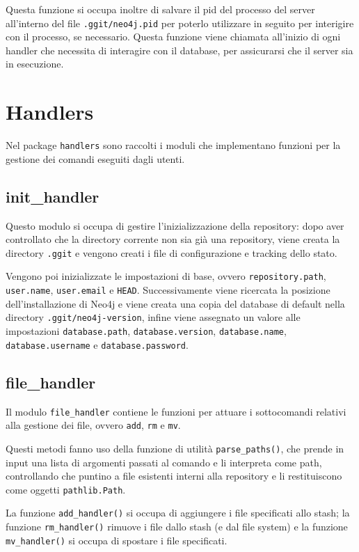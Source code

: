 Questa funzione si occupa inoltre di salvare il pid del processo del server all'interno del file \texttt{.ggit/neo4j.pid} per poterlo utilizzare in seguito per interigire con il processo, se necessario.
Questa funzione viene chiamata all'inizio di ogni handler che necessita di interagire con il database, per assicurarsi che il server sia in esecuzione.

\section{Handlers}
Nel package \texttt{handlers} sono raccolti i moduli che implementano funzioni per la gestione dei comandi eseguiti dagli utenti.



\subsection{init\_handler}
Questo modulo si occupa di gestire l'inizializzazione della repository: dopo aver controllato che la directory corrente non sia già una repository, viene creata la directory \texttt{.ggit} e vengono creati i file di configurazione e tracking dello stato.

Vengono poi inizializzate le impostazioni di base, ovvero \texttt{repository.path}, \texttt{user.name}, \texttt{user.email} e \texttt{HEAD}. 
Successivamente viene ricercata la posizione dell'installazione di Neo4j e viene creata una copia del database di default nella directory \texttt{.ggit/neo4j-version}, infine viene assegnato un valore alle impostazioni \texttt{database.path}, \texttt{database.version}, \texttt{database.name}, \texttt{database.username} e \texttt{database.password}.

\subsection{file\_handler}
Il modulo \texttt{file\_handler} contiene le funzioni per attuare i sottocomandi relativi alla gestione dei file, ovvero \texttt{add}, \texttt{rm} e \texttt{mv}.

Questi metodi fanno uso della funzione di utilità \texttt{parse\_paths()}, che prende in input una lista di argomenti passati al comando e li interpreta come path, controllando che puntino a file esistenti interni alla repository e li restituiscono come oggetti \texttt{pathlib.Path}.

La funzione \texttt{add\_handler()} si occupa di aggiungere i file specificati allo stash; la  funzione \texttt{rm\_handler()} rimuove i file dallo stash (e dal file system) e la funzione \texttt{mv\_handler()} si occupa di spostare i file specificati.

